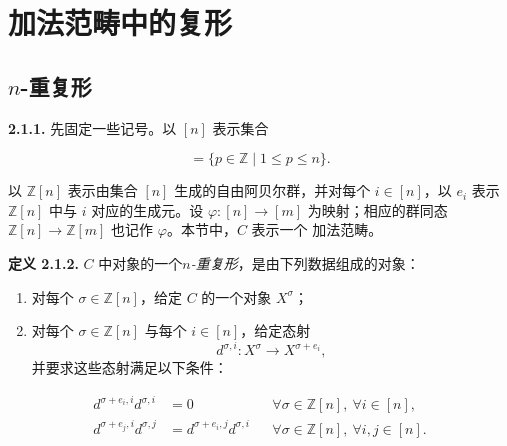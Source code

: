 \clearpage
{}%
\section{加法范畴中的复形}

\subsection{\texorpdfstring{$n$}{n}-重复形}

\noindent\textbf{2.1.1.}\quad
先固定一些记号。以 $[n]$ 表示集合

\begin{equation*}
  [n]=\{p\in\mathbb Z\mid 1\leq p\leq n\}.
\end{equation*}

以 $\mathbb Z[n]$ 表示由集合 $[n]$ 生成的自由阿贝尔群，并对每个
$i\in[n]$，以 $e_i$ 表示 $\mathbb Z[n]$ 中与 $i$ 对应的生成元。设
$\varphi\colon[n]\to[m]$ 为映射；相应的群同态
$\mathbb Z[n]\to\mathbb Z[m]$ 也记作 $\varphi$。本节中，$C$ 表示一个
加法范畴。

\noindent\textbf{定义 2.1.2.}\quad
$C$ 中对象的一个\emph{$n$-重复形}，是由下列数据组成的对象：

\begin{enumerate}
\renewcommand{\labelenumi}{\arabic{enumi})}
\item {}%
  对每个 $\sigma\in\mathbb Z[n]$，给定 $C$ 的一个对象 $X^\sigma$；
\item {}%
  对每个 $\sigma\in\mathbb Z[n]$ 与每个 $i\in[n]$，给定态射
  \begin{equation*}
    d^{\sigma,i}\colon X^\sigma\longrightarrow X^{\sigma+e_i},
  \end{equation*}
  并要求这些态射满足以下条件：
\end{enumerate}

\begin{equation}
  \begin{aligned}
    d^{\sigma+e_i,i}d^{\sigma,i}&=0
      &&\forall\sigma\in\mathbb Z[n],\ \forall i\in[n],\\
    d^{\sigma+e_j,i}d^{\sigma,j}
      &=d^{\sigma+e_i,j}d^{\sigma,i}
      &&\forall\sigma\in\mathbb Z[n],\ \forall i,j\in[n].
  \end{aligned}
  \tag{2.1.2.1}
\end{equation}

